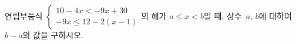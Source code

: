 연립부등식 $\begin{cases} 10-4x<-9x+30 \\ -9x\le 12-2(x-1) \end{cases}$의 해가 $a\le x<b$일 때, 상수~$a$, $b$에 대하여 $b-a$의 값을 구하시오.
